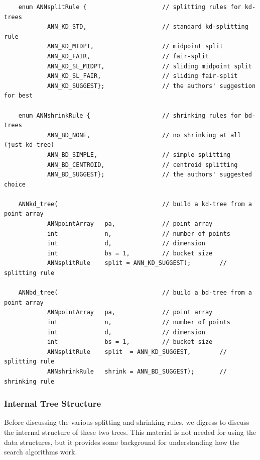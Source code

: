 \documentclass[11pt]{article}		%
\begin{document}
{\small \begin{verbatim}
    enum ANNsplitRule {                     // splitting rules for kd-trees
            ANN_KD_STD,                     // standard kd-splitting rule
            ANN_KD_MIDPT,                   // midpoint split
            ANN_KD_FAIR,                    // fair-split
            ANN_KD_SL_MIDPT,                // sliding midpoint split
            ANN_KD_SL_FAIR,                 // sliding fair-split
            ANN_KD_SUGGEST};                // the authors' suggestion for best

    enum ANNshrinkRule {                    // shrinking rules for bd-trees
            ANN_BD_NONE,                    // no shrinking at all (just kd-tree)
            ANN_BD_SIMPLE,                  // simple splitting
            ANN_BD_CENTROID,                // centroid splitting
            ANN_BD_SUGGEST};                // the authors' suggested choice
        
    ANNkd_tree(                             // build a kd-tree from a point array
            ANNpointArray   pa,             // point array
            int             n,              // number of points
            int             d,              // dimension
            int             bs = 1,         // bucket size
            ANNsplitRule    split = ANN_KD_SUGGEST);        // splitting rule

    ANNbd_tree(                             // build a bd-tree from a point array
            ANNpointArray   pa,             // point array
            int             n,              // number of points
            int             d,              // dimension
            int             bs = 1,         // bucket size
            ANNsplitRule    split  = ANN_KD_SUGGEST,        // splitting rule
            ANNshrinkRule   shrink = ANN_BD_SUGGEST);       // shrinking rule
\end{verbatim} }


\subsubsection{Internal Tree Structure}\label{intern.sec}

Before discussing the various splitting and shrinking rules, we digress
to discuss the internal structure of these two trees.  This material is
not needed for using the data structures, but it provides some
background for understanding how the search algorithms work.
\end{document}
